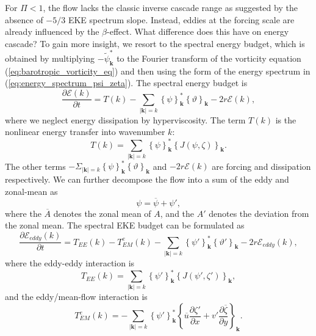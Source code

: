 \documentclass{ametsoc}
\begin{document}
For $\Pi<1$, the flow lacks the classic inverse cascade range as 
suggested by the absence of $-5/3$ EKE spectrum slope. Instead, eddies at 
the forcing scale are already influenced by the $\beta$-effect. What difference 
does this have on energy cascade? To gain more insight, we resort to the spectral energy budget,
which is obtained by multiplying $-\widetilde{\psi}_{\mathbf{k}}^{*}$
to the Fourier transform of the vorticity equation (\ref{eq:barotropic_vorticity_eq})
and then using the form of the energy spectrum in (\ref{eq:energy_spectrum_psi_zeta}).
The spectral energy budget is
\begin{equation}
\frac{\partial\mathcal{E}(k)}{\partial t}=T(k)-\underset{|\mathbf{k}|=k}{\sum}\left\{ \psi\right\} _{\mathbf{k}}^{*}\left\{ \vartheta\right\} _{\mathbf{k}}-2r\mathcal{E}(k),
\end{equation}
where we neglect energy dissipation by hyperviscosity. The term $T(k)$
is the nonlinear energy transfer into wavenumber $k$:
\begin{equation}
T(k)=\underset{|\mathbf{k}|=k}{\sum}\left\{ \psi\right\} _{\mathbf{k}}^{*}\left\{ J(\psi,\zeta)\right\} _{\mathbf{k}}.
\end{equation}
The other terms $-\Sigma_{|\mathbf{k}|=k}\left\{ \psi\right\} _{\mathbf{k}}^{*}\left\{ \vartheta\right\} _{\mathbf{k}}$
and $-2r\mathcal{E}(k)$ are forcing and dissipation respectively.
We can further decompose the flow into a sum of the eddy and zonal-mean as
\begin{equation}
\psi=\overline{\psi}+\psi',
\end{equation}
where the $\overline{A}$ denotes the zonal mean of $A$, and the
$A'$ denotes the deviation from the zonal mean. The spectral EKE
budget can be formulated as
\begin{equation}
\frac{\partial\mathcal{E}_{eddy}(k)}{\partial t}=T_{EE}(k)-T_{EM}^{e}(k)-\underset{|\mathbf{k}|=k}{\sum}\left\{ \psi'\right\} _{\mathbf{k}}^{*}\left\{ \vartheta'\right\} _{\mathbf{k}}-2r\mathcal{E}_{eddy}(k),\label{eq:spectral_EKE_budget}
\end{equation}
where the eddy-eddy interaction is 
\begin{equation}
T_{EE}(k)=\underset{|\mathbf{k}|=k}{\sum}\left\{ \psi'\right\} _{\mathbf{k}}^{*}\left\{ J(\psi',\zeta')\right\} _{\mathbf{k}},
\end{equation}
and the eddy/mean-flow interaction is
\begin{equation}
T_{EM}^{e}(k)=-\underset{|\mathbf{k}|=k}{\sum}\left\{ \psi'\right\} _{\mathbf{k}}^{*}\left\{ \overline{u}\frac{\partial\zeta'}{\partial x}+v'\frac{\partial\overline{\zeta}}{\partial y}\right\} _{\mathbf{k}}.
\end{equation}
\end{document}
